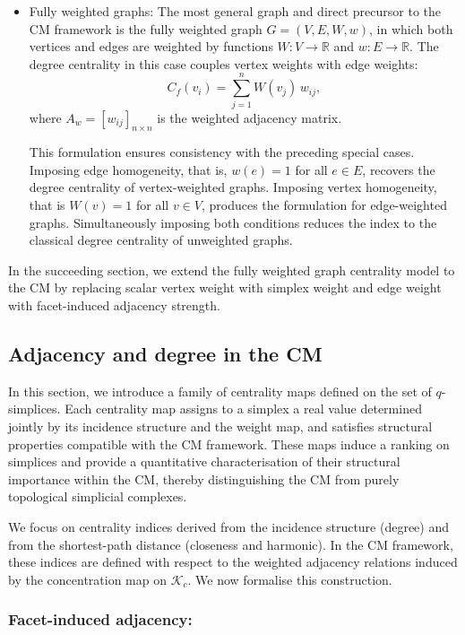 \documentclass[12pt]{article}
\theoremstyle{normalhead_nobrackets}
\theoremstyle{exampstyle}
\begin{document}
\begin{itemize}
\item [(d)] {Fully weighted graphs:}
The most general graph and direct precursor to the CM framework is the fully weighted graph $G=(V,E,W,w)$, in which both vertices and edges are weighted by functions $W : V \to \mathbb{R}$ and $w : E \to \mathbb{R}$. The degree centrality in this case couples vertex weights with edge weights:
\begin{equation}\label{1eq:fully-weig-degre}
C_f(v_i) = \sum_{j=1}^n W(v_j)\, w_{ij},
\end{equation}
where $A_w = [w_{ij}]_{n \times n}$ is the weighted adjacency matrix.

This formulation ensures consistency with the preceding special cases. Imposing edge homogeneity, that is, $w(e) = 1$ for all $e \in E$, recovers the degree centrality of vertex-weighted graphs. Imposing vertex homogeneity, that is $W(v) = 1$ for all $v \in V$, produces the formulation for edge-weighted graphs. Simultaneously imposing both conditions reduces the index to the classical degree centrality of unweighted graphs.
\end{itemize}

In the succeeding section, we extend the fully weighted graph centrality model to the CM by replacing scalar vertex weight with simplex weight and edge weight with facet-induced adjacency strength.


\subsection{Adjacency and degree in the CM}

In this section, we introduce a family of centrality maps defined on the set of $q$-simplices. Each centrality map assigns to a simplex a real value determined jointly by its incidence structure and the weight map, and satisfies structural properties compatible with the CM framework. These maps induce a ranking on simplices and provide a quantitative characterisation of their structural importance within the CM, thereby distinguishing the CM from purely topological simplicial complexes.

We focus on centrality indices derived from the incidence structure (degree) and from the shortest-path distance (closeness and harmonic). In the CM framework, these indices are defined with respect to the weighted adjacency relations induced by the concentration map on $\mathcal{K}_c$. We now formalise this construction.


\subsubsection{Facet-induced adjacency:}
\end{document}
